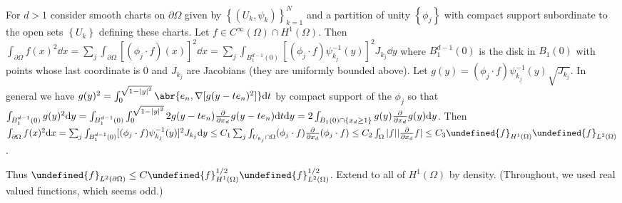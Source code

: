\documentclass[11pt,leqno]{article}
\theoremstyle{plain}
\theoremstyle{definition}
\numberwithin{equation}{section}
\numberwithin{lem}{section}
\newcommand{\cbr}[1]{\left\{#1\right\}}
\let\norm\undefined %
\DeclarePairedDelimiter\norm{\lVert}{\rVert}
\begin{document}
\begin{enumerate}
\begin{enumerate}
        For $d>1$ consider smooth charts on $\partial \Omega$ given by $\cbr{(U_k,\psi_k)}_{k=1}^N$ and a partition of unity $\cbr{\phi_j}$ with compact support subordinate to the open sets $\cbr{U_k}$ defining these charts. Let $f\in C^\infty(\Omega)\cap H^1(\Omega)$. Then $\int_{\partial \Omega} f(x)^2\dd x = \sum_j\int_{\partial \Omega}[(\phi_j \cdot f)(x)]^2\dd x = \sum_j\int_{B^{d-1}_1(0)}[(\phi_j\cdot f)\psi_{k_j}^{-1}(y)]^2J_{k_j}\dd y$ where $B_1^{d-1}(0)$ is the disk in $B_1(0)$ with points whose last coordinate is $0$ and $J_{k_j}$ are Jacobians (they are uniformly bounded above). Let $g(y) = (\phi_j\cdot f)\psi_{k_j}^{-1}(y)\sqrt{J_{k_j}}$. In general we have $g(y)^2 = \int_0^{\sqrt{1-\abs{y}^2}}\abr{e_n,\nabla[g(y-te_n)^2]}\dd t$ by compact support of the $\phi_j$ so that $\int_{B^{d-1}_1(0)}g(y)^2\dd y = \int_{B^{d-1}_1(0)}\int_0^{\sqrt{1-\abs{y}^2}}2g(y-te_n)\pdv{x_d}g(y-te_n)\dd t\dd y= 2\int_{B_1(0)\cap \cbr{x_d\geq 1}}g(y)\pdv{x_d}g(y)\dd y$. Then $\int_{\partial \Omega} f(x)^2\dd x = \sum_j\int_{B^{d-1}_1(0)}[(\phi_j\cdot f)\psi_{k_j}^{-1}(y)]^2J_{k_j}\dd y \leq C_1\sum_j\int_{U_{k_j}\cap \Omega}(\phi_j\cdot f)\pdv{x_d}(\phi_j\cdot f)\leq C_2\int_\Omega\abs{f}|\pdv{x_d}f|\leq C_3\norm{f}_{H^1(\Omega)}\norm{f}_{L^2(\Omega)}$.
        
        Thus $\norm{f}_{L^2(\partial \Omega)}\leq C\norm{f}_{H^1(\Omega)}^{1/2}\norm{f}_{L^2(\Omega)}^{1/2}$. Extend to all of $H^1(\Omega)$ by density. (Throughout, we used real valued functions, which seems odd.)
    \end{enumerate}
\end{enumerate}
\end{document}
